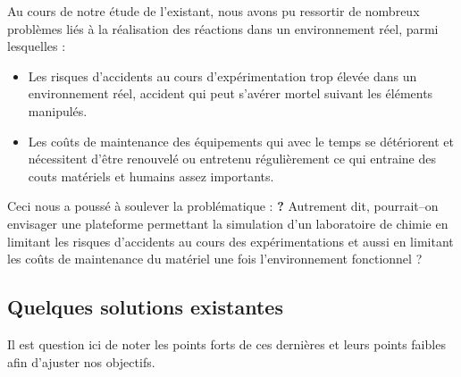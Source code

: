 Au cours de notre étude de l’existant, nous avons pu ressortir de nombreux problèmes liés à la réalisation des réactions dans un environnement réel, parmi lesquelles :

\begin{itemize}
	\item Les risques d’accidents au cours d'expérimentation trop élevée dans un environnement réel, accident qui peut s’avérer mortel suivant les éléments manipulés.
	\item Les coûts de maintenance des équipements qui avec le temps se détériorent et nécessitent d’être renouvelé ou entretenu régulièrement ce qui entraine des couts matériels et humains assez importants.
\end{itemize}

Ceci nous a poussé à soulever la problématique : \textbf{\og \pb ? \fg} Autrement dit, pourrait–on envisager une plateforme permettant la simulation d’un laboratoire de chimie en limitant les risques d’accidents au cours des expérimentations et aussi en limitant les coûts de maintenance du matériel une fois l'environnement fonctionnel ?

\subsection{Quelques solutions existantes}

Il est question ici de noter les points forts de ces dernières et leurs points faibles afin d’ajuster nos objectifs.

